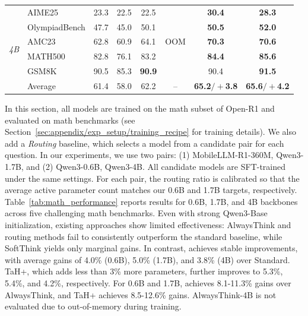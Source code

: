 \begin{table}[t]
\begin{tabular}{ll|cccccc}
    \midrule
    \multirow{7}{*}{\textit{4B}}& AIME25 & 23.3& 22.5 & 22.5 & \multirow{5}{*}{OOM}& \textbf{30.4}& \textbf{28.3} \\
    & OlympiadBench & 47.7& 45.0 & 50.1 & & \textbf{50.5}& \textbf{52.0} \\
    & AMC23 & 62.8& 60.9 & 64.1 & & \textbf{70.3}& \textbf{70.6} \\
    & MATH500 & 82.8& 76.1 & 83.2 & & \textbf{84.4}& \textbf{85.6} \\
    & GSM8K & 90.5& 85.3 & \textbf{90.9} & & 90.4& \textbf{91.5} \\
    \cmidrule(lr){2-8}
    & Average & 61.4& 58.0 & 62.2& --& \textbf{65.2{\scriptsize$/+$3.8}}& \textbf{65.6{\scriptsize$/+$4.2}} \\
    \bottomrule
    \end{tabular}
\end{table}

In this section, all models are trained on the math subset of Open-R1 and evaluated on math benchmarks (see Section~\ref{sec:appendix/exp_setup/training_recipe} for training details).
We also add a \emph{Routing} baseline, which selects a model from a candidate pair for each question. In our experiments, we use two pairs: (1) MobileLLM-R1-360M, Qwen3-1.7B, and (2) Qwen3-0.6B, Qwen3-4B.
All candidate models are SFT-trained under the same settings. For each pair, the routing ratio is calibrated so that the average active parameter count matches our 0.6B and 1.7B targets, respectively.
Table~\ref{tab:math_performance} reports results for 0.6B, 1.7B, and 4B backbones across five challenging math benchmarks.
Even with strong Qwen3-Base initialization, existing approaches show limited effectiveness: AlwaysThink and routing methods fail to consistently outperform the standard baseline, while SoftThink yields only marginal gains.
In contrast, \name achieves stable improvements, with average gains of 4.0\% (0.6B), 5.0\% (1.7B), and 3.8\% (4B) over Standard.
TaH+, which adds less than 3\% more parameters, further improves to 5.3\%, 5.4\%, and 4.2\%, respectively.
For 0.6B and 1.7B, \name achieves 8.1-11.3\% gains over AlwaysThink, and TaH+ achieves 8.5-12.6\% gains. AlwaysThink-4B is not evaluated due to out-of-memory during training.

